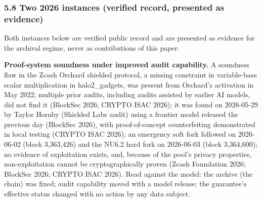 \documentclass[
]{llncs}
\begin{document}
\subsubsection{5.8 Two 2026 instances (verified record, presented as
evidence)}\label{two-2026-instances-verified-record-presented-as-evidence}

Both instances below are verified public record and are presented as
evidence for the archival regime, never as contributions of this paper.

\textbf{Proof-system soundness under improved audit capability.} A
soundness flaw in the Zcash Orchard shielded protocol, a missing
constraint in variable-base scalar multiplication in halo2\_gadgets, was
present from Orchard's activation in May 2022; multiple prior audits,
including audits assisted by earlier AI models, did not find it
(BlockSec 2026; CRYPTO ISAC 2026); it was found on 2026-05-29 by Taylor
Hornby (Shielded Labs audit) using a frontier model released the
previous day (BlockSec 2026), with proof-of-concept counterfeiting
demonstrated in local testing (CRYPTO ISAC 2026); an emergency soft fork
followed on 2026-06-02 (block 3,363,426) and the NU6.2 hard fork on
2026-06-03 (block 3,364,600); no evidence of exploitation exists, and,
because of the pool's privacy properties, non-exploitation cannot be
cryptographically proven (Zcash Foundation 2026; BlockSec 2026; CRYPTO
ISAC 2026). Read against the model: the archive (the chain) was fixed;
audit capability moved with a model release; the guarantee's effective
status changed with no action by any data subject.
\end{document}
